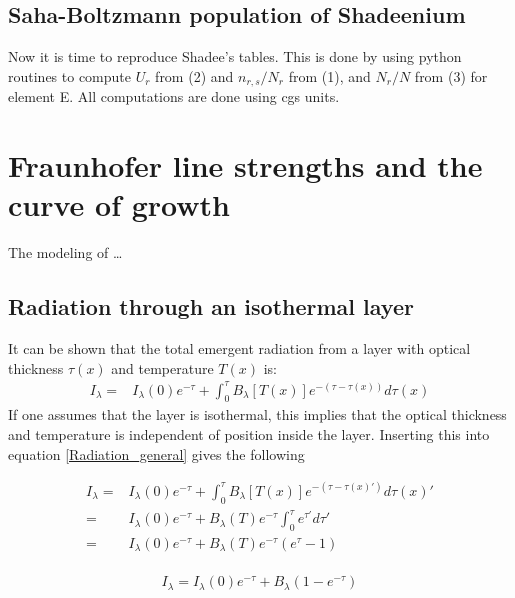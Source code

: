 \documentclass{aa}   %
\begin{document}
\subsection{Saha-Boltzmann population of Shadeenium}
Now it is time to reproduce Shadee's tables. This is done by using python routines to compute $U_r$ from (2) and $n_{r,s}/N_r$ from (1), and $N_r/N$ from (3) for element E. All computations are done using cgs units.
\section{Fraunhofer line strengths and the curve of growth}   \label{sec:Fraunhofer}
The modeling of \dots

\subsection{Radiation through an isothermal layer}
It can be shown that the total emergent radiation from a layer with optical thickness $\tau(x)$ and temperature $T(x)$ is:
\begin{equation}\label{Radiation_general}
\begin{aligned}
 I_{\lambda} =& I_{\lambda}(0)e^{-\tau} + \int_0^\tau B_{\lambda}[T(x)]e^{-(\tau - \tau(x))}d\tau(x)
\end{aligned}
\end{equation}
If one assumes that the layer is isothermal, this implies that the optical thickness and temperature is independent of position inside the layer. Inserting this into equation \ref{Radiation_general} gives the following

\begin{equation*}
\begin{aligned}
I_{\lambda} =& I_{\lambda}(0)e^{-\tau} + \int_0^\tau B_{\lambda}[T(x)]e^{-(\tau - \tau(x)')}d\tau(x)'\\
	    =& I_{\lambda}(0)e^{-\tau} + B_{\lambda}(T)e^{-\tau}\int_0^\tau e^{\tau'}d\tau'\\
	    =& I_{\lambda}(0)e^{-\tau} + B_{\lambda}(T)e^{-\tau}(e^{\tau} - 1)\\
\end{aligned}
\end{equation*}

\begin{equation}\label{Radiation_isothermal}
 I_{\lambda} = I_{\lambda}(0)e^{-\tau} + B_{\lambda}(1 - e^{-\tau})
\end{equation}
\end{document}
